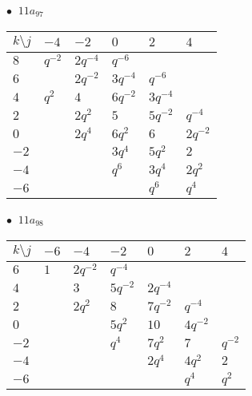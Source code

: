 \begin{minipage}{\linewidth}
$\bullet\ $ $11a_{97}$ \vspace{0.5em} \\
\begin{tabular}{l|lllll}
$k \setminus j$ & $-4$ & $-2$ & $0$ & $2$ & $4$ \\
\hline
$8$ & $q^{-2}$ & $2q^{-4}$ & $q^{-6}$ &  &  \\
$6$ &  & $2q^{-2}$ & $3q^{-4}$ & $q^{-6}$ &  \\
$4$ & $q^{2}$ & $4$ & $6q^{-2}$ & $3q^{-4}$ &  \\
$2$ &  & $2q^{2}$ & $5$ & $5q^{-2}$ & $q^{-4}$ \\
$0$ &  & $2q^{4}$ & $6q^{2}$ & $6$ & $2q^{-2}$ \\
$-2$ &  &  & $3q^{4}$ & $5q^{2}$ & $2$ \\
$-4$ &  &  & $q^{6}$ & $3q^{4}$ & $2q^{2}$ \\
$-6$ &  &  &  & $q^{6}$ & $q^{4}$ \\
\end{tabular}
\vspace{2em}
\end{minipage}
%
\begin{minipage}{\linewidth}
$\bullet\ $ $11a_{98}$ \vspace{0.5em} \\
\begin{tabular}{l|llllll}
$k \setminus j$ & $-6$ & $-4$ & $-2$ & $0$ & $2$ & $4$ \\
\hline
$6$ & $1$ & $2q^{-2}$ & $q^{-4}$ &  &  &  \\
$4$ &  & $3$ & $5q^{-2}$ & $2q^{-4}$ &  &  \\
$2$ &  & $2q^{2}$ & $8$ & $7q^{-2}$ & $q^{-4}$ &  \\
$0$ &  &  & $5q^{2}$ & $10$ & $4q^{-2}$ &  \\
$-2$ &  &  & $q^{4}$ & $7q^{2}$ & $7$ & $q^{-2}$ \\
$-4$ &  &  &  & $2q^{4}$ & $4q^{2}$ & $2$ \\
$-6$ &  &  &  &  & $q^{4}$ & $q^{2}$ \\
\end{tabular}
\vspace{2em}
\end{minipage}
%
